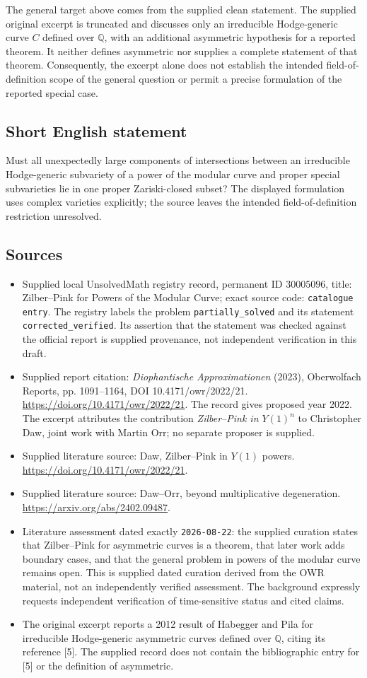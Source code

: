 \documentclass[11pt]{article}
\newcommand{\Q}{\mathbb{Q}}
\begin{document}
The general target above comes from the supplied clean statement. The supplied original excerpt is truncated and discusses only an irreducible Hodge-generic curve \(C\) defined over \(\Q\), with an additional asymmetric hypothesis for a reported theorem. It neither defines asymmetric nor supplies a complete statement of that theorem. Consequently, the excerpt alone does not establish the intended field-of-definition scope of the general question or permit a precise formulation of the reported special case.
\subsection{Short English statement}
Must all unexpectedly large components of intersections between an irreducible Hodge-generic subvariety of a power of the modular curve and proper special subvarieties lie in one proper Zariski-closed subset? The displayed formulation uses complex varieties explicitly; the source leaves the intended field-of-definition restriction unresolved.
\subsection{Sources}
\begin{itemize}
\item Supplied local UnsolvedMath registry record, permanent ID \(30005096\), title: Zilber--Pink for Powers of the Modular Curve; exact source code: \texttt{catalogue entry}. The registry labels the problem \texttt{partially\_solved} and its statement \texttt{corrected\_verified}. Its assertion that the statement was checked against the official report is supplied provenance, not independent verification in this draft.
\item Supplied report citation: \emph{Diophantische Approximationen} (2023), Oberwolfach Reports, pp. 1091--1164, DOI 10.4171/owr/2022/21. \url{https://doi.org/10.4171/owr/2022/21}. The record gives proposed year 2022. The excerpt attributes the contribution \emph{Zilber--Pink in \(Y(1)^n\)} to Christopher Daw, joint work with Martin Orr; no separate proposer is supplied.
\item Supplied literature source: Daw, Zilber--Pink in \(Y(1)\) powers. \url{https://doi.org/10.4171/owr/2022/21}.
\item Supplied literature source: Daw--Orr, beyond multiplicative degeneration. \url{https://arxiv.org/abs/2402.09487}.
\item Literature assessment dated exactly \texttt{2026-08-22}: the supplied curation states that Zilber--Pink for asymmetric curves is a theorem, that later work adds boundary cases, and that the general problem in powers of the modular curve remains open. This is supplied dated curation derived from the OWR material, not an independently verified assessment. The background expressly requests independent verification of time-sensitive status and cited claims.
\item The original excerpt reports a 2012 result of Habegger and Pila for irreducible Hodge-generic asymmetric curves defined over \(\Q\), citing its reference [5]. The supplied record does not contain the bibliographic entry for [5] or the definition of asymmetric.
\end{itemize}
\end{document}
